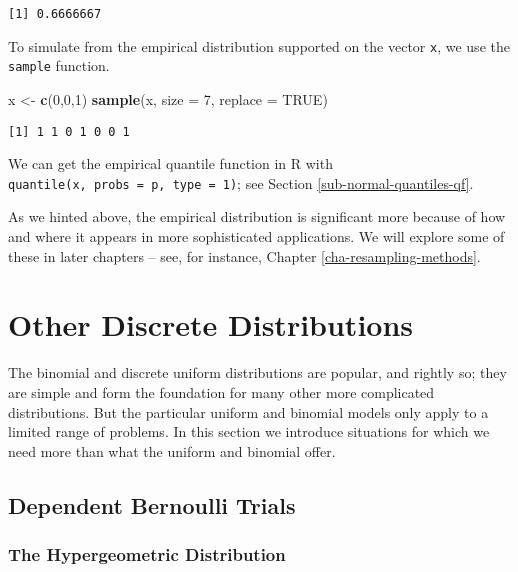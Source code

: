 \documentclass[]{book}
\newenvironment{Shaded}{\begin{snugshade}}{\end{snugshade}}
\newcommand{\KeywordTok}[1]{\textcolor[rgb]{0.13,0.29,0.53}{\textbf{{#1}}}}
\newcommand{\DataTypeTok}[1]{\textcolor[rgb]{0.13,0.29,0.53}{{#1}}}
\newcommand{\DecValTok}[1]{\textcolor[rgb]{0.00,0.00,0.81}{{#1}}}
\newcommand{\StringTok}[1]{\textcolor[rgb]{0.31,0.60,0.02}{{#1}}}
\newcommand{\OtherTok}[1]{\textcolor[rgb]{0.56,0.35,0.01}{{#1}}}
\newcommand{\NormalTok}[1]{{#1}}
\numberwithin{equation}{chapter}
\numberwithin{figure}{chapter}
\theoremstyle{plain}
\theoremstyle{definition}
\theoremstyle{remark}
\theoremstyle{definition}
\theoremstyle{definition}
\theoremstyle{remark}
\begin{document}
\begin{verbatim}
[1] 0.6666667
\end{verbatim}

To simulate from the empirical distribution supported on the vector
\texttt{x}, we use the \texttt{sample} 
function.

\begin{Shaded}
\begin{Highlighting}[]
\NormalTok{x <-}\StringTok{ }\KeywordTok{c}\NormalTok{(}\DecValTok{0}\NormalTok{,}\DecValTok{0}\NormalTok{,}\DecValTok{1}\NormalTok{)}
\KeywordTok{sample}\NormalTok{(x, }\DataTypeTok{size =} \DecValTok{7}\NormalTok{, }\DataTypeTok{replace =} \OtherTok{TRUE}\NormalTok{)}
\end{Highlighting}
\end{Shaded}

\begin{verbatim}
[1] 1 1 0 1 0 0 1
\end{verbatim}

We can get the empirical quantile function in R with
\texttt{quantile(x,\ probs\ =\ p,\ type\ =\ 1)}; see Section
\ref{sub-normal-quantiles-qf}.

As we hinted above, the empirical distribution is significant more
because of how and where it appears in more sophisticated applications.
We will explore some of these in later chapters -- see, for instance,
Chapter \ref{cha-resampling-methods}.

\section{Other Discrete
Distributions}\label{sec-other-discrete-distributions}

The binomial and discrete uniform distributions are popular, and rightly
so; they are simple and form the foundation for many other more
complicated distributions. But the particular uniform and binomial
models only apply to a limited range of problems. In this section we
introduce situations for which we need more than what the uniform and
binomial offer.

\subsection{Dependent Bernoulli Trials}\label{sec-non-bernoulli-trials}

\subsubsection{The Hypergeometric
Distribution}\label{sub-hypergeometric-dist}
\end{document}
